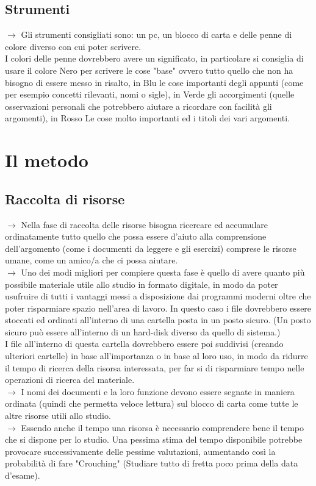 \documentclass[11pt,a4paper]{article}
\begin{document}
\subsection{Strumenti}
$\rightarrow$ Gli strumenti consigliati sono: un pc, un blocco di carta e delle penne di colore diverso con cui poter scrivere.\\
 I colori delle penne dovrebbero avere un significato, in particolare si consiglia di usare il colore Nero per scrivere le cose "base" ovvero tutto quello che non ha bisogno di essere messo in risalto, in Blu le cose importanti degli appunti (come per esempio concetti rilevanti, nomi o sigle), in Verde gli accorgimenti (quelle osservazioni personali che potrebbero aiutare a ricordare con facilità gli argomenti), in Rosso Le cose molto importanti ed i titoli dei vari argomenti.\\
\newline

\section{Il metodo}
\subsection{Raccolta di risorse}
$\rightarrow$ Nella fase di raccolta delle risorse bisogna ricercare ed accumulare ordinatamente tutto quello che possa essere d'aiuto alla comprensione dell'argomento (come i documenti da leggere e gli esercizi) comprese le risorse umane, come un amico/a che ci possa aiutare.\\
$\rightarrow$ Uno dei modi migliori per compiere questa fase è quello di avere quanto più possibile materiale utile allo studio in formato digitale, in modo da poter usufruire di tutti i vantaggi messi a disposizione dai programmi moderni oltre che poter risparmiare spazio nell'area di lavoro. In questo caso i file dovrebbero essere stoccati ed ordinati all'interno di una cartella posta in un posto sicuro. (Un posto sicuro può essere all'interno di un hard-disk diverso da quello di sistema.)\\
I file all'interno di questa cartella dovrebbero essere poi suddivisi (creando ulteriori cartelle) in base all'importanza o in base al loro uso, in modo da ridurre il tempo di ricerca della risorsa interessata, per far si di risparmiare tempo nelle operazioni di ricerca del materiale.\\ 
$\rightarrow$ I nomi dei documenti e la loro funzione devono essere segnate in maniera ordinata (quindi che permetta veloce lettura) sul blocco di carta come tutte le altre risorse utili allo studio.\\
$\rightarrow$ Essendo anche il tempo una risorsa è necessario comprendere bene il tempo che si dispone per lo studio. Una pessima stima del tempo disponibile potrebbe provocare successivamente delle pessime valutazioni, aumentando così la probabilità di fare "Crouching" (Studiare tutto di fretta poco prima della data d'esame).\\
\end{document}
